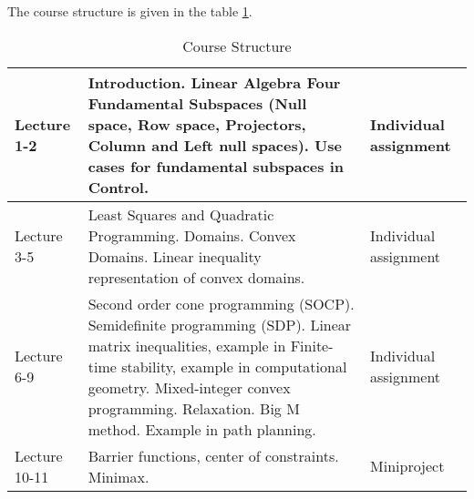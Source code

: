 
The course structure is given in the table \ref{t:course_structure}.

\begin{table}[h]
	\caption{Course Structure}
	\label{t:course_structure}
\begin{tabular}{p{25mm}|p{100mm}|p{30mm}}
  \hline
Lecture 1-2	& 
Introduction. \newline
Linear Algebra Four Fundamental Subspaces
(Null space, Row space, Projectors, Column and Left null spaces). \newline
Use cases for fundamental subspaces in Control. &	
Individual \newline assignment 
\\   \hline
%
Lecture 3-5 &
Least Squares and Quadratic Programming. \newline
Domains. Convex Domains. \newline
Linear inequality representation of convex domains.	& 
Individual \newline assignment 
\\   \hline
%
Lecture 6-9	& 
Second order cone programming (SOCP). \newline
Semidefinite programming (SDP). \newline
Linear matrix inequalities, example in Finite-time stability, example in computational geometry. \newline
Mixed-integer convex programming. \newline Relaxation. Big M method. Example in path planning.	& 
Individual \newline assignment 
\\   \hline
%
Lecture 10-11	& 
Barrier functions, center of constraints. \newline
Minimax.	& 
Miniproject 
\\  \hline
\end{tabular}
\end{table}